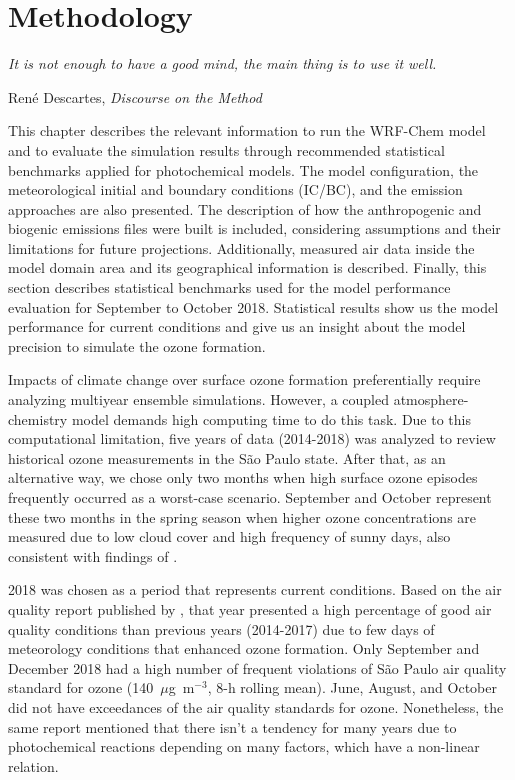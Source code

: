 \chapter{\bf Methodology}\label{chap:metho}
\epigraph{\textit{It is not enough to have a good mind, the main thing is to use it well.}}{Ren\'{e} Descartes, \textit{Discourse on the Method}}

\noindent This chapter describes the relevant information to run the WRF-Chem model and to evaluate the simulation results through recommended statistical benchmarks applied for photochemical models. 
The model configuration, the meteorological initial and boundary conditions (IC/BC), and the emission approaches are also presented.
The description of how the anthropogenic and biogenic emissions files were built is included, considering assumptions and their limitations for future projections.
Additionally, measured air data inside the model domain area and its geographical information is described.
Finally, this section describes statistical benchmarks used for the model performance evaluation for September to October 2018.
Statistical results show us the model performance for current conditions and give us an insight about the model precision to simulate the ozone formation.

Impacts of climate change over surface ozone formation preferentially require analyzing multiyear ensemble simulations.
However, a coupled atmosphere-chemistry model demands high computing time to do this task.
Due to this computational limitation, five years of data (2014-2018) was analyzed to review historical ozone measurements in the S\~{a}o Paulo state. 
After that, as an alternative way, we chose only two months when high surface ozone episodes frequently occurred as a worst-case scenario.
September and October represent these two months in the spring season when higher ozone concentrations are measured due to low cloud cover and high frequency of sunny days, also consistent with findings of \citet{Carvalho2015}.

2018 was chosen as a period that represents current conditions.
Based on the air quality report published by \citet{CETESB2019}, that year presented a high percentage of good air quality conditions than previous years (2014-2017) due to few days of meteorology conditions that enhanced ozone formation.
Only September and December 2018 had a high number of frequent violations of S\~{a}o Paulo air quality standard for ozone (140~$\mu$g~m$^{-3}$, 8-h rolling mean).
June, August, and October did not have exceedances of the air quality standards for ozone.
Nonetheless, the same report mentioned that there isn't a tendency for many years due to photochemical reactions depending on many factors, which have a non-linear relation.

